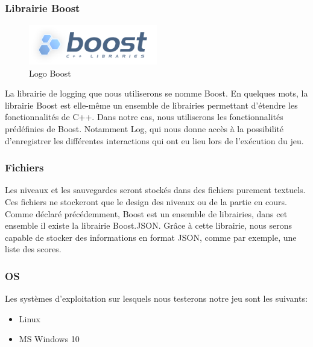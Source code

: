 \subsubsection{Librairie Boost}
\begin{figure}[h]
	\centering
	\includegraphics[width=0.5\textwidth]{pictures/Boost_logo.png}
	\caption{Logo Boost}
	\label{fig:logo_boost}
\end{figure}
La librairie de logging que nous utiliserons se nomme Boost. En quelques mots, la librairie Boost est elle-même un ensemble de librairies permettant d'étendre les fonctionnalités de C++. Dans notre cas, nous utiliserons les fonctionnalités prédéfinies de Boost. Notamment Log, qui nous donne accès à la possibilité d'enregistrer les différentes interactions qui ont eu lieu lors de l'exécution du jeu.

\subsubsection{Fichiers}
Les niveaux et les sauvegardes seront stockés dans des fichiers purement textuels. Ces fichiers ne stockeront que le design des niveaux ou de la partie en cours.
Comme déclaré précédemment, Boost est un ensemble de librairies, dans cet ensemble il existe la librairie Boost.JSON. Grâce à cette librairie, nous serons capable de stocker des informations en format JSON, comme par exemple, une liste des scores.

\subsubsection{OS}
Les systèmes d'exploitation sur lesquels nous testerons notre jeu sont les suivants:
\begin{itemize}
	\item Linux
	\item MS Windows 10
	\end{itemize}
